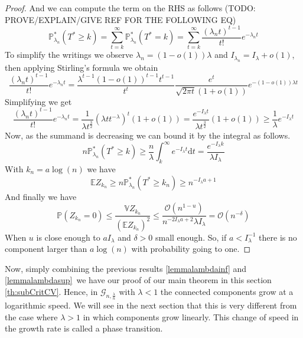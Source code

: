 \begin{proof}
	And we can compute the term on the RHS as follows (TODO: PROVE/EXPLAIN/GIVE REF FOR THE FOLLOWING EQ)
	\begin{equation}
		\mathbb{P}_{\lambda_n}^*(T^* \geq k)
		 = \sum_{t=k}^{\infty} \mathbb{P}_{\lambda_n}^*(T^* = k)
		 = \sum_{t=k}^{\infty} \frac{(\lambda_n t)^{t-1}}{t!} e^{-\lambda_n t}
	\end{equation}
	To simplify the writings we observe $\lambda_n = (1-o(1))\lambda$ and $I_{\lambda_n} = I_{\lambda} + o(1)$, then applying Stirling's formula we obtain
	\begin{equation}
		\frac{(\lambda_n t)^{t-1}}{t!} e^{-\lambda_n t}
		= \frac{\lambda^{t-1} (1-o(1))^{t-1}t^{t-1}}{t^t} \frac{e^t}{\sqrt{2\pi t}(1 + o(1))} e^{-(1-o(1))\lambda t}	
	\end{equation}
	Simplifying we get
	\begin{equation}
		\frac{(\lambda_n t)^{t-1}}{t!} e^{-\lambda_n t}
		= \frac{1}{\lambda t^{\frac{3}{2}}}(\lambda t t^{-\lambda})^t (1 + o(1))
		= \frac{e^{-I_{\lambda} t }}{\lambda t^{\frac{3}{2}}} (1 + o(1)) \geq \frac{1}{\lambda}e^{-I_{\lambda} t}
	\end{equation}
	Now, as the summand is decreasing we can bound it by the integral as follows.
	\begin{equation}
		n\mathbb{P}_{\lambda_n}^*(T^* \geq k)
		\geq \frac{n}{\lambda} \int_{k}^{\infty} e^{-I_{\lambda} t} \mathrm{d}t
		 = \frac{e^{-I_{\lambda} k}}{\lambda I_{\lambda}}
	\end{equation}
	With $k_n = a\log(n)$ we have 
	\begin{equation}
		\mathbb{E} Z_{k_n} \geq n\mathbb{P}_{\lambda_n}^*(T^* \geq k_n) \geq n^{-I_{\lambda} a + 1}
	\end{equation}
	And finally we have
	\begin{equation}
		\mathbb{P}(Z_{k_n} = 0) \leq \frac{\mathbb{V}Z_{k_n}}{(\mathbb{E}Z_{k_n})^2} \leq \frac{\mathcal{O}(n^{ 1 - u})}{n^{-2I_{\lambda}a + 2} \lambda I_{\lambda}} 	
		= \mathcal{O}(n^{ -\delta})
	\end{equation}
	When $u$ is close enough to $aI_{\lambda}$ and $\delta >0$ small enough.
	\newline
	So, if $a<I_{\lambda}^{-1}$ there is no component larger than $a\log(n)$ with probability going to one.
\end{proof}
Now, simply combining the previous results \eqref{lemmalambdainf} and \eqref{lemmalambdasup} we have our proof of our main theorem in this section \eqref{th:subCritCV}.
Hence, in $\mathcal{G}_{n, \frac{\lambda}{n}}$ with $\lambda < 1$ the connected components grow at a logarithmic speed. We will see in the next section that this is very different from the case where $\lambda > 1$ in which components grow linearly.
This change of speed in the growth rate is called a phase transition.

